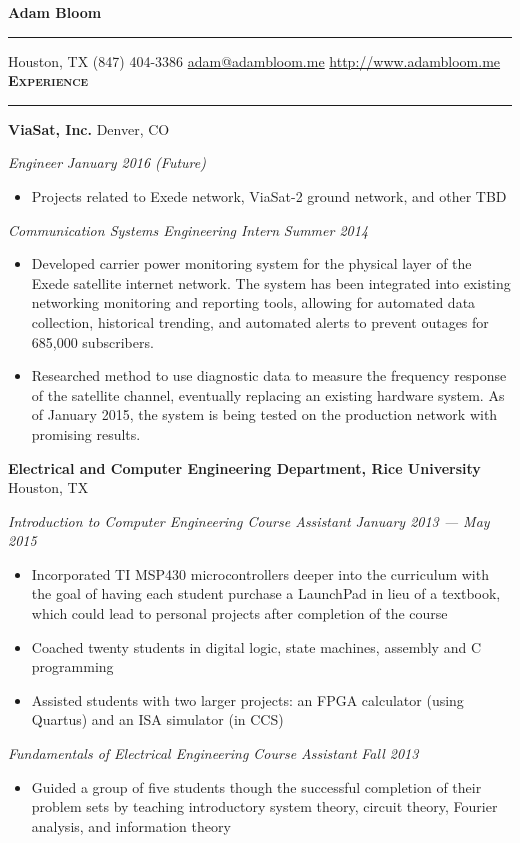 \documentclass[10pt,letterpaper]{article}
\newcommand*{\seriffont}{\fontfamily{yv1}\selectfont}
\newcommand{\printName}[1]{
{\huge \textbf{#1}}
\vspace{0.25em}
\hrule
\vspace{0.25em}
}
\newenvironment{resumeSection}[1]{
{\Large \textbf{\textsc{#1}}}
\vspace{0.25em}
\hrule
\vspace{0.5em}
}{

}
\newenvironment{employer}[2]{
{\large \textbf{#1} \hfill #2} \newline
}{
\vspace{0.5em}
}
\newenvironment{position}[2]{
{\large \emph{#1} \hfill \emph{#2}}
\seriffont 
\begin{itemize}[noitemsep,topsep=0pt]
}{
\end{itemize}
\vspace{0.5em}
}
\begin{document}
\printName{Adam Bloom}
Houston, TX \hfill (847) 404-3386 \hfill \href{mailto:adam@adambloom.me}{adam@adambloom.me} \hfill \href{http://www.adambloom.me}{http://www.adambloom.me}
\vspace{0.5em} \newline
\begin{resumeSection}{Experience}
\begin{employer}{ViaSat, Inc.}{Denver, CO}
\begin{position}{Engineer}{January 2016 (Future)}
\item Projects related to Exede network, ViaSat-2 ground network, and other TBD
\end{position}
\begin{position}{Communication Systems Engineering Intern}{Summer 2014}
\item Developed carrier power monitoring system for the physical layer of the Exede satellite internet network. The system has been integrated into existing networking monitoring and reporting tools, allowing for automated data collection, historical trending, and automated alerts to prevent outages for 685,000 subscribers.
    \item Researched method to use diagnostic data to measure the frequency response of the satellite channel, eventually replacing an existing hardware system. As of January 2015, the system is being tested on the production network with promising results.
\end{position}
\end{employer}

\begin{employer}{Electrical and Computer Engineering Department, Rice University}{Houston, TX}
\begin{position}{Introduction to Computer Engineering Course Assistant}{January 2013 --- May 2015}
\item Incorporated TI MSP430 microcontrollers deeper into the curriculum with the goal of having each student purchase a LaunchPad in lieu of a textbook, which could lead to personal projects after completion of the course
\item Coached twenty students in digital logic, state machines, assembly and C programming
\item Assisted students with two larger projects: an FPGA calculator (using Quartus) and an ISA simulator (in CCS)
\end{position}
\begin{position}{Fundamentals of Electrical Engineering Course Assistant}{Fall 2013}
\item Guided a group of five students though the successful completion of their problem sets by teaching introductory system theory, circuit theory, Fourier analysis, and information theory
\end{position}
\end{employer}


\end{resumeSection}
\end{document}
